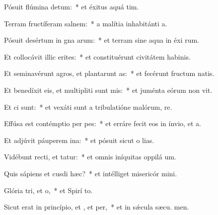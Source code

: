 \item Pósuit flúmina  detum:~* et éxitus aquá  tim.
\item Terram fructíferam  salnem:~* a malítia inhabitánti  a.
\item Pósuit desértum in gna arum:~* et terram sine aqua in éxi rum.
\item Et collocávit illic erites:~* et constituérunt civitátem habinis.
\item Et seminavérunt agros, et plantarunt as:~* et fecérunt fructum natis.
\item Et benedíxit eis, et multipliti sunt mis:~* et juménta eórum non vit.
\item Et ci  sunt:~* et vexáti sunt a tribulatióne malórum,  re.
\item Effúsa est contémptio per pes:~* et erráre fecit eos in ínvio, et   a.
\item Et adjúvit páuperem  ina:~* et pósuit sicut o lias.
\item Vidébunt recti, et tatur:~* et omnis iníquitas oppilá  um.
\item Quis sápiens et cusdi hæc?~* et intélliget misericór mini.
\item Glória tri, et o,~* et Spirí to.
\item Sicut erat in princípio, et , et per,~* et in sǽcula sæcu. men.
